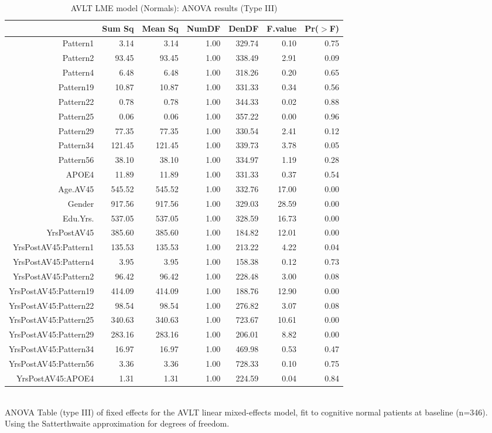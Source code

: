 \documentclass{article}
\begin{document}
\begin{table}[ht]
\caption{AVLT LME model (Normals): ANOVA results (Type III) }
\centering
\begin{tabular}{rrrrrrr}
  \hline
 & Sum Sq & Mean Sq & NumDF & DenDF & F.value & Pr($>$F) \\ 
  \hline
  Pattern1 & 3.14 & 3.14 & 1.00 & 329.74 & 0.10 & 0.75 \\ 
  Pattern2 & 93.45 & 93.45 & 1.00 & 338.49 & 2.91 & 0.09 \\ 
  Pattern4 & 6.48 & 6.48 & 1.00 & 318.26 & 0.20 & 0.65 \\ 
  Pattern19 & 10.87 & 10.87 & 1.00 & 331.33 & 0.34 & 0.56 \\ 
  Pattern22 & 0.78 & 0.78 & 1.00 & 344.33 & 0.02 & 0.88 \\ 
  Pattern25 & 0.06 & 0.06 & 1.00 & 357.22 & 0.00 & 0.96 \\ 
  Pattern29 & 77.35 & 77.35 & 1.00 & 330.54 & 2.41 & 0.12 \\ 
  Pattern34 & 121.45 & 121.45 & 1.00 & 339.73 & 3.78 & 0.05 \\ 
  Pattern56 & 38.10 & 38.10 & 1.00 & 334.97 & 1.19 & 0.28 \\ 
  APOE4 & 11.89 & 11.89 & 1.00 & 331.33 & 0.37 & 0.54 \\ 
  Age.AV45 & 545.52 & 545.52 & 1.00 & 332.76 & 17.00 & 0.00 \\ 
  Gender & 917.56 & 917.56 & 1.00 & 329.03 & 28.59 & 0.00 \\ 
  Edu.Yrs. & 537.05 & 537.05 & 1.00 & 328.59 & 16.73 & 0.00 \\ 
  YrsPostAV45 & 385.60 & 385.60 & 1.00 & 184.82 & 12.01 & 0.00 \\ 
  YrsPostAV45:Pattern1 & 135.53 & 135.53 & 1.00 & 213.22 & 4.22 & 0.04 \\ 
  YrsPostAV45:Pattern4 & 3.95 & 3.95 & 1.00 & 158.38 & 0.12 & 0.73 \\ 
  YrsPostAV45:Pattern2 & 96.42 & 96.42 & 1.00 & 228.48 & 3.00 & 0.08 \\ 
  YrsPostAV45:Pattern19 & 414.09 & 414.09 & 1.00 & 188.76 & 12.90 & 0.00 \\ 
  YrsPostAV45:Pattern22 & 98.54 & 98.54 & 1.00 & 276.82 & 3.07 & 0.08 \\ 
  YrsPostAV45:Pattern25 & 340.63 & 340.63 & 1.00 & 723.67 & 10.61 & 0.00 \\ 
  YrsPostAV45:Pattern29 & 283.16 & 283.16 & 1.00 & 206.01 & 8.82 & 0.00 \\ 
  YrsPostAV45:Pattern34 & 16.97 & 16.97 & 1.00 & 469.98 & 0.53 & 0.47 \\ 
  YrsPostAV45:Pattern56 & 3.36 & 3.36 & 1.00 & 728.33 & 0.10 & 0.75 \\ 
  YrsPostAV45:APOE4 & 1.31 & 1.31 & 1.00 & 224.59 & 0.04 & 0.84 \\ 
   \hline
\end{tabular}
\\[10pt]
ANOVA Table (type III) of fixed effects for the AVLT linear mixed-effects model, fit to cognitive normal patients at baseline (n=346). Using the Satterthwaite approximation for degrees of freedom.
\end{table}
\end{document}
